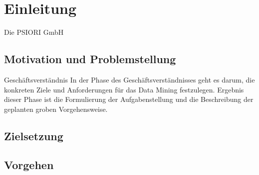 \listoftodos


 
\chapter{Einleitung}
\label{chap:Einleitung}

 Die PSIORI GmbH  

	\section{Motivation und Problemstellung}
	\label{sec:MotivationUndProblemstellung}

	Geschäftsverständnis
	In der Phase des Geschäftsverständnisses geht es darum, die konkreten Ziele und Anforderungen für das Data Mining festzulegen. Ergebnis dieser Phase ist die Formulierung der Aufgabenstellung und die Beschreibung der geplanten groben Vorgehensweise.
	

	\section{Zielsetzung}
	\label{sec:Zielsetzung}

	\section{Vorgehen}
	\label{sec:Vorgehen}



